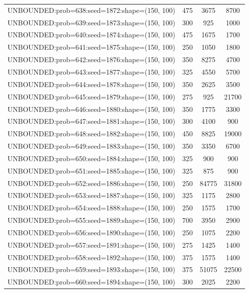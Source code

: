 \begin{longtable}{lccc}
UNBOUNDED:prob=638:seed=1872:shape=(150, 100) &      475 &  3675 &   8700 \\
UNBOUNDED:prob=639:seed=1873:shape=(150, 100) &      300 &   925 &   1000 \\
UNBOUNDED:prob=640:seed=1874:shape=(150, 100) &      475 &  1675 &   1700 \\
UNBOUNDED:prob=641:seed=1875:shape=(150, 100) &      250 &  1050 &   1800 \\
UNBOUNDED:prob=642:seed=1876:shape=(150, 100) &      350 &  8275 &   4700 \\
UNBOUNDED:prob=643:seed=1877:shape=(150, 100) &      325 &  4550 &   5700 \\
UNBOUNDED:prob=644:seed=1878:shape=(150, 100) &      350 &  2625 &   3500 \\
UNBOUNDED:prob=645:seed=1879:shape=(150, 100) &      275 &   925 &  21700 \\
UNBOUNDED:prob=646:seed=1880:shape=(150, 100) &      350 &  1775 &   3300 \\
UNBOUNDED:prob=647:seed=1881:shape=(150, 100) &      300 &  4100 &    900 \\
UNBOUNDED:prob=648:seed=1882:shape=(150, 100) &      450 &  8825 &  19000 \\
UNBOUNDED:prob=649:seed=1883:shape=(150, 100) &      350 &  3350 &   6700 \\
UNBOUNDED:prob=650:seed=1884:shape=(150, 100) &      325 &   900 &    900 \\
UNBOUNDED:prob=651:seed=1885:shape=(150, 100) &      325 &   875 &    900 \\
UNBOUNDED:prob=652:seed=1886:shape=(150, 100) &      250 & 84775 &  31800 \\
UNBOUNDED:prob=653:seed=1887:shape=(150, 100) &      325 &  1175 &   2800 \\
UNBOUNDED:prob=654:seed=1888:shape=(150, 100) &      250 &  1575 &   1700 \\
UNBOUNDED:prob=655:seed=1889:shape=(150, 100) &      700 &  3950 &   2900 \\
UNBOUNDED:prob=656:seed=1890:shape=(150, 100) &      250 &  1075 &   2200 \\
UNBOUNDED:prob=657:seed=1891:shape=(150, 100) &      275 &  1425 &   1400 \\
UNBOUNDED:prob=658:seed=1892:shape=(150, 100) &      375 &  1575 &   1400 \\
UNBOUNDED:prob=659:seed=1893:shape=(150, 100) &      375 & 51075 &  22500 \\
UNBOUNDED:prob=660:seed=1894:shape=(150, 100) &      300 &  2025 &   2200 \\

\end{longtable}
